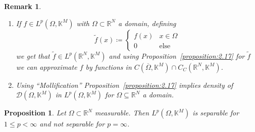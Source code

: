 \documentclass[a4paper]{article}
\newcounter{lecref}[section]
\numberwithin{lecref}{section}
\newtheorem*{Remark}{Remark}
\newtheorem{proposition}[lecref]{Proposition}
\begin{document}
\begin{Remark}
	\begin{enumerate}
		\item If $f \in L^p(\Omega, \mathbb K^M)$ with $\Omega \subset \mathbb R^N$ a domain, defining
			\[ \tilde f(x) \coloneqq \begin{cases} f(x) & x \in \Omega \\ 0 & \text{else} \end{cases} \]
			we get that $\tilde f \in L^p(\mathbb R^N, \mathbb K^M)$ and using Proposition~\ref{proposition:2.17} for $\tilde f$ we can approximate $f$ by functions in $C(\overline\Omega, \mathbb K^M) \cap C_C(\mathbb R^N, \mathbb K^M)$.
		\item Using \enquote{Mollification} Proposition~\ref{proposition:2.17} implies density of $\mathcal D(\Omega, \mathbb K^M)$ in $L^p(\Omega, \mathbb K^M)$ for $\Omega \subseteq \mathbb R^N$ a domain.
	\end{enumerate}
\end{Remark}

\begin{proposition}
	\label{proposition:2.18}
	Let $\Omega \subset \mathbb R^N$ measurable. Then $L^p(\Omega, \mathbb K^M)$ is separable for $1 \leq p < \infty$ and not separable for $p = \infty$.
\end{proposition}
\end{document}
